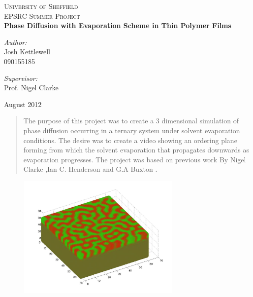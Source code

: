 \documentclass{article}
\numberwithin{equation}{section} %
\begin{document}
\begin{center}
\textsc{\LARGE University of Sheffield}\\[1.5cm]
\textsc{\Large EPSRC Summer Project}\\[0.5cm]
{ \huge \bfseries Phase Diffusion with Evaporation Scheme in Thin Polymer Films}\\
\begin{minipage}{0.4\textwidth}
\begin{flushleft} \large
\emph{Author:}\\
Josh Kettlewell\\
090155185
\end{flushleft}
\end{minipage}
\begin{minipage}{0.4\textwidth}
\begin{flushright} \large
\emph{Supervisor:} \\
Prof. Nigel Clarke\\
\end{flushright}
\end{minipage}
\vfill
{\large August 2012}
\end{center}
\thispagestyle{empty}
\newpage



\thispagestyle{empty}
\begin{abstract}
The purpose of this project was to create a 3 dimensional simulation of phase diffusion occurring in a ternary system under solvent evaporation conditions. The desire was to create a video showing an ordering plane forming from which the solvent evaporation that propagates downwards as evaporation progresses. The project was based on previous work By Nigel Clarke ,Ian C. Henderson and G.A Buxton \cite{main}. 
\end{abstract}


\begin{figure}[h]
\begin{center}
\includegraphics[width=8cm]{diffusion_3.jpg}
\label{info3}
\end{center}
\end{figure}
\end{document}
